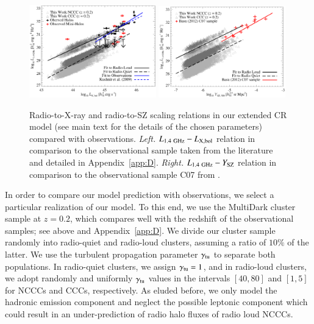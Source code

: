 \documentclass[useAMS,usenatbib]{mn2e}
\begin{document}
\begin{figure} 
\centering
\includegraphics[width=0.49\textwidth]{figures/PL_relation.eps}
\includegraphics[width=0.49\textwidth]{figures/PSZ_relation.eps}
\caption{Radio-to-X-ray and radio-to-SZ scaling relations in our extended CR model
  (see main text for the details of the chosen parameters) compared with
  observations.  \emph{Left.} $L_{1.4~{\mathrm{GHz}}}-L_{{\mathrm{X,bol}}}$ relation in
  comparison to the observational sample taken from the literature and detailed
  in Appendix~\ref{app:D}. \emph{Right.} $L_{1.4~{\mathrm{GHz}}}-Y_{{\mathrm{SZ}}}$
  relation in comparison to the observational sample C07 from
  \protect\cite{2012MNRAS.421L.112B}.}
\label{fig:PLSZ}
\end{figure} 

In order to compare our model prediction with observations, we select a
particular realization of our model. To this end, we use the MultiDark cluster
sample at $z=0.2$, which compares well with the redshift of the observational
samples; see above and Appendix~\ref{app:D}. We divide our cluster sample
randomly into radio-quiet and radio-loud clusters, assuming a ratio of $10\%$ of
the latter. We use the turbulent propagation parameter $\gamma_{{\mathrm{tu}}}$ to
separate both populations. In radio-quiet clusters, we assign
$\gamma_{{\mathrm{tu}}}=1$, and in radio-loud clusters, we adopt randomly and
uniformly $\gamma_{{\mathrm{tu}}}$ values in the intervals $[40,80]$ and $[1,5]$ for
NCCCs and CCCs, respectively. As eluded before, we only model the hadronic
emission component and neglect the possible leptonic component which could
result in an under-prediction of radio halo fluxes of radio loud NCCCs.
\end{document}
